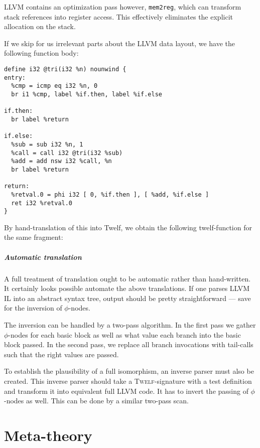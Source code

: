 \documentclass[a4paper, oneside, 10pt, draft]{memoir}
\newcommand{\twelf}{\textsc{Twelf}}
\begin{document}
LLVM contains an optimization pass however, \texttt{mem2reg}, which
can transform stack references into register access. This effectively
eliminates the explicit allocation on the stack.

If we skip for us irrelevant parts about the LLVM data layout, we have
the following function body:
\begin{verbatim}
define i32 @tri(i32 %n) nounwind {
entry:
  %cmp = icmp eq i32 %n, 0
  br i1 %cmp, label %if.then, label %if.else

if.then:
  br label %return

if.else:
  %sub = sub i32 %n, 1
  %call = call i32 @tri(i32 %sub)
  %add = add nsw i32 %call, %n
  br label %return

return:
  %retval.0 = phi i32 [ 0, %if.then ], [ %add, %if.else ]
  ret i32 %retval.0
}
\end{verbatim}
By hand-translation of this into Twelf, we obtain the following
twelf-function for the same fragment:
\paragraph{Automatic translation}

A full treatment of translation ought to be automatic rather than
hand-written. It certainly looks possible automate the above
translations. If one parses LLVM IL into an abstract syntax tree,
output should be pretty straightforward --- save for the inversion of
$\phi$-nodes.

The inversion can be handled by a two-pass algorithm. In the first
pass we gather $\phi$-nodes for each basic block as well as what value
each branch into the basic block passed. In the second pass, we
replace all branch invocations with tail-calls such that the right
values are passed.

To establish the plausibility of a full isomorphism, an inverse parser
must also be created. This inverse parser should take a
\twelf{}-signature with a test definition and transform it into
equivalent full LLVM code. It has to invert the passing of
$\phi$-nodes as well. This can be done by a similar two-pass scan.

\chapter{Meta-theory}

\end{document}
